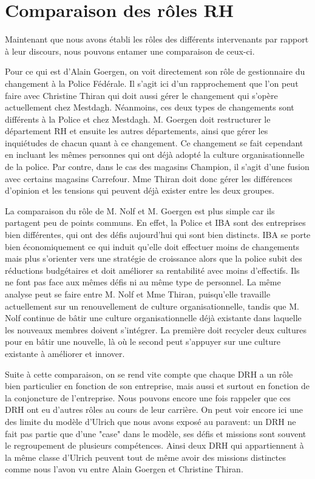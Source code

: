 \section{Comparaison des rôles RH}

Maintenant que nous avons établi les rôles des différents intervenants par rapport à leur discours, nous pouvons entamer une comparaison de ceux-ci. \newline


Pour ce qui est d'Alain Goergen, on voit directement son rôle de gestionnaire du changement à la Police Fédérale. Il s'agit ici d'un rapprochement que l'on peut faire avec Christine Thiran qui doit aussi gérer le changement qui s'opère actuellement chez Mestdagh. Néanmoins, ces deux types de changements sont différents à la Police et chez Mestdagh. M. Goergen doit restructurer le département RH et ensuite les autres départements, ainsi que gérer les inquiétudes de chacun quant à ce changement. Ce changement se fait cependant en incluant les mêmes personnes qui ont déjà adopté la culture organisationnelle de la police. Par contre, dans le cas des magasins Champion, il s'agit d'une fusion avec certains magasins Carrefour. Mme Thiran doit donc gérer les différences d'opinion et les tensions qui peuvent déjà exister entre les deux groupes. \newline

La comparaison du rôle de M. Nolf et M. Goergen est plus simple car ils partagent peu de points communs. En effet, la Police et IBA sont des entreprises bien différentes, qui ont des défis aujourd'hui qui sont bien distincts. IBA se porte bien économiquement ce qui induit qu'elle doit effectuer moins de changements mais plus s'orienter vers une stratégie de croissance alors que la police subit des réductions budgétaires et doit améliorer sa rentabilité avec moins d'effectifs. Ils ne font pas face aux mêmes défis ni au même type de personnel. La même analyse peut se faire entre M. Nolf et Mme Thiran, puisqu'elle travaille actuellement sur un renouvellement de culture organisationnelle, tandis que M. Nolf continue de bâtir une culture organisationnelle déjà existante dans laquelle les nouveaux membres doivent s'intégrer. La première doit recycler deux cultures pour en bâtir une nouvelle, là où le second peut s'appuyer sur une culture existante à améliorer et innover.


Suite à cette comparaison, on se rend vite compte que chaque DRH a un rôle bien particulier en fonction de son entreprise, mais aussi et surtout en fonction de la conjoncture de l'entreprise. Nous pouvons encore une fois rappeler que ces DRH ont eu d'autres rôles au cours de leur carrière. 
On peut voir encore ici une des limite du modèle d'Ulrich que nous avons exposé au paravent: un DRH ne fait pas partie que d'une "case" dans le modèle, ses défis et missions sont souvent le regroupement de plusieurs compétences. Ainsi deux DRH qui appartiennent à la même classe d'Ulrich peuvent tout de même avoir des missions distinctes comme nous l'avon vu entre Alain Goergen et Christine Thiran.
